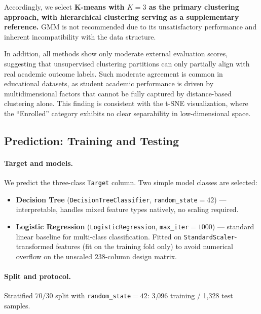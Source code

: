 \documentclass[11pt]{article}
\begin{document}
Accordingly, we select \textbf{K-means with $K=3$ as the primary clustering approach, with hierarchical 
clustering serving as a supplementary reference.} GMM is not recommended due to its unsatisfactory 
performance and inherent incompatibility with the data structure.

In addition, all methods show only moderate external evaluation scores, suggesting that unsupervised 
clustering partitions can only partially align with real academic outcome labels. Such moderate agreement 
is common in educational datasets, as student academic performance is driven by multidimensional factors 
that cannot be fully captured by distance-based clustering alone. This finding is consistent with the 
t-SNE visualization, where the “Enrolled” category exhibits no clear separability in low-dimensional space.

\subsection{Prediction: Training and Testing}

\paragraph{Target and models.} We predict the three-class
\texttt{Target} column. Two simple model classes are selected:

\begin{itemize}
  \item \textbf{Decision Tree} (\texttt{DecisionTreeClassifier},
        \texttt{random\_state}$=42$) --- interpretable, handles mixed
        feature types natively, no scaling required.
  \item \textbf{Logistic Regression}
        (\texttt{LogisticRegression}, \texttt{max\_iter}$=1000$) ---
        standard linear baseline for multi-class classification.
        Fitted on \texttt{StandardScaler}-transformed features
        (fit on the training fold only) to avoid numerical overflow
        on the unscaled $238$-column design matrix.
\end{itemize}

\paragraph{Split and protocol.} Stratified $70/30$ split with
\texttt{random\_state}$=42$: 3{,}096 training / 1{,}328 test samples.
\end{document}
